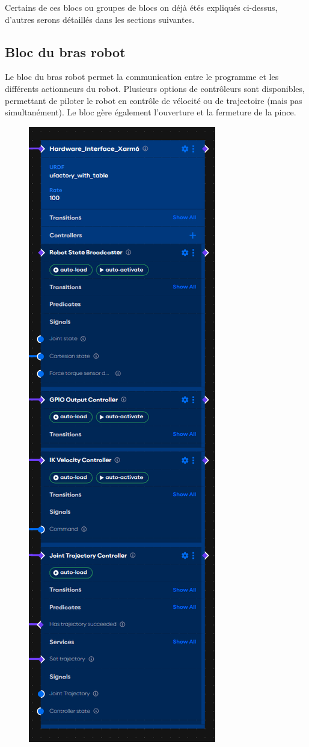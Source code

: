 Certains de ces blocs ou groupes de blocs on déjà étés expliqués ci-dessus, d'autres serons détaillés dans les sections suivantes.

\subsection{Bloc du bras robot}

Le bloc du bras robot permet la communication entre le programme et les différents actionneurs du robot. Plusieurs options de contrôleurs sont disponibles, permettant de piloter le robot en contrôle de vélocité ou de trajectoire (mais pas simultanément). Le bloc gère également l'ouverture et la fermeture de la pince.

\begin{figure}[H]
    \centering
    \includegraphics[height=0.8\textheight,keepaspectratio]{assets/figures/AICA_Hardware_interface.png}

\end{figure}
